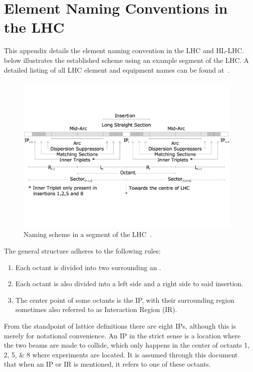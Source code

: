 \chapter{Element Naming Conventions in the LHC}
\label{appendix:naming_conventions}

This appendix details the element naming convention in the \gls{LHC} and \gls{HL-LHC}.
 below illustrates the established scheme using an example segment of the LHC.
A detailed listing of all LHC element and equipment names can be found at~\cite{CERN:Equipment_Codes}.

\begin{figure}[h]
    \centering
    \includegraphics*[width=0.9\linewidth]{Figures/Appendices/LHC_naming_scheme.pdf}
    \caption{Naming scheme in a segment of the LHC~\cite{CERN:Element_Naming}.}
    \label{figure:lhc_segment_naming_scheme}
\end{figure}

The general structure adheres to the following rules:
\begin{enumerate}
    \item Each octant is divided into two  surrounding an .
    \item Each octant is also divided into a left side and a right side to said insertion.
    \item The center point of some octants is the \gls{IP}, with their surrounding region sometimes also referred to as Interaction Region (\acrshort{IR}).
\end{enumerate}

From the standpoint of lattice definitions there are eight IPs, although this is merely for notational convenience. 
An \acrlong{IP} in the strict sense is a location where the two beams are made to collide, which only happens in the center of octants \numlist{1;2;5;8} where \glspl{experiment} are located.
It is assumed through this document that when an IP or IR is mentioned, it refers to one of these octants.

